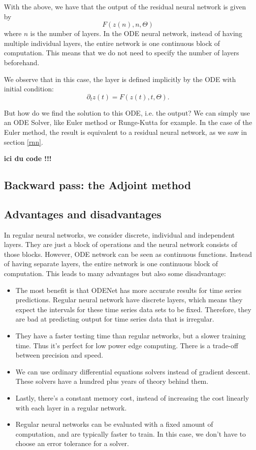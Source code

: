 \documentclass[10pt,a4paper]{article}
\theoremstyle{definition}
\theoremstyle{theorem}
\begin{document}
With the above, we have that the output of the residual neural network is given by
$$ F(z(n), n, \Theta) $$
where $n$ is the number of layers. 
In the ODE neural network, instead of having multiple individual layers, the entire network is one continuous block of computation. This means that we do not need to specify the number of layers beforehand.

We observe that in this case, the layer is defined implicitly by the ODE with initial condition:
$$ \partial_t z(t) = F(z(t), t, \Theta). $$

But how do we find the solution to this ODE, i.e. the output? We can simply use an ODE Solver, like Euler method or Runge-Kutta for example. In the case of the Euler method, the result is equivalent to a residual neural network, as we saw in section \ref{rnn}.

\textbf{ici du code !!!}
 
\subsection{Backward pass: the Adjoint method}



\subsection{Advantages and disadvantages  }

In regular neural networks, we consider discrete, individual and independent layers. They are just a block of operations and the neural network consists of those blocks. However, ODE network can be seen as continuous functions. Instead of having separate layers, the entire network is one continuous block of computation. This leads to many advantages but also some disadvantage:
\begin{itemize}
\item The most benefit is that ODENet has more accurate results for time series predictions. Regular neural network have discrete layers, which means they expect the intervals for these time series data sets to be fixed. Therefore, they are bad at predicting output for time series data that is irregular.
\item They have a faster testing time than regular networks, but a slower training time. Thus it's perfect for low power edge computing. There is a trade-off between precision and speed.
\item We can use ordinary differential equations solvers instead of gradient descent. These solvers have a hundred plus years of theory behind them.
\item Lastly, there's a constant memory cost, instead of increasing the cost linearly with each layer in a regular network.
\item Regular neural networks can be evaluated with a fixed amount of computation, and are typically faster to train. In this case, we don't have to choose an error tolerance for a solver.
\end{itemize}
\end{document}
